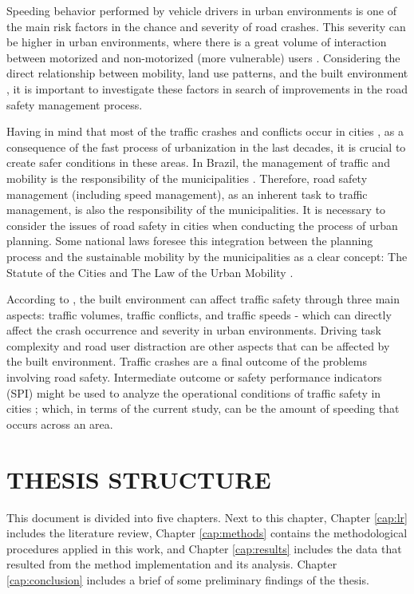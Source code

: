 Speeding behavior performed by vehicle drivers in urban environments is one of the main risk factors in the chance and severity of road crashes. This severity can be higher in urban environments, where there is a great volume of interaction between motorized and non-motorized (more vulnerable) users \cite{Elvik2009}. Considering the direct relationship between mobility, land use patterns, and the built environment \cite{DeVos2013}, it is important to investigate these factors in search of improvements in the road safety management process.

Having in mind that most of the traffic crashes and conflicts occur in cities \cite{WHO2018}, as a consequence of the fast process of urbanization in the last decades, it is crucial to create safer conditions in these areas. In Brazil, the management of traffic and mobility is the responsibility of the municipalities \cite{Brasil1997}. Therefore, road safety management (including speed management), as an inherent task to traffic management, is also the responsibility of the municipalities. It is necessary to consider the issues of road safety in cities when conducting the process of urban planning. Some national laws foresee this integration between the planning process and the sustainable mobility by the municipalities as a clear concept: The Statute of the Cities \cite{Brasil2001} and The Law of the Urban Mobility \cite{Brasil2012}.    

According to \textcite{Ewing2009}, the built environment can affect traffic safety through three main aspects: traffic volumes, traffic conflicts, and traffic speeds - which can directly affect the crash occurrence and severity in urban environments. Driving task complexity \cite{Onate-Vega2020} and road user distraction \cite{Chen2021} are other aspects that can be affected by the built environment. Traffic crashes are a final outcome of the problems involving road safety. Intermediate outcome or safety performance indicators (SPI) might be used to analyze the operational conditions of traffic safety in cities \cite{Bastos2014}; which, in terms of the current study, can be the amount of speeding that occurs across an area.

\section{THESIS STRUCTURE}

This document is divided into five chapters. Next to this chapter, Chapter \ref{cap:lr} includes the literature review, Chapter \ref{cap:methods} contains the methodological procedures applied in this work, and Chapter \ref{cap:results} includes the data that resulted from the method implementation and its analysis. Chapter \ref{cap:conclusion} includes a brief of some preliminary findings of the thesis. 

